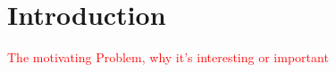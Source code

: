 \section{Introduction}
\label{sec:intro}

\textcolor{red}{The motivating Problem, why it's interesting or important}
